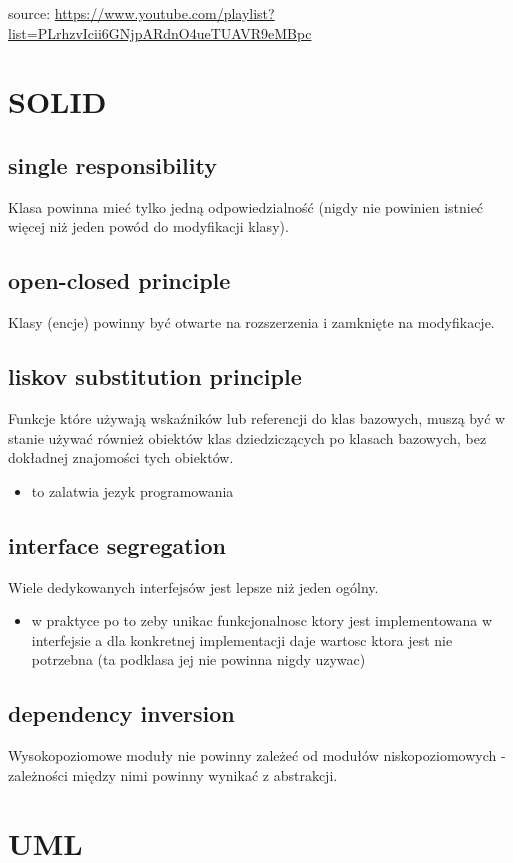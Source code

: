 \documentclass[11pt]{article}
\author{Patryk Kaniewski}
\date{\today}
\title{}
\begin{document}
\tableofcontents \clearpageOP source: \url{https://www.youtube.com/playlist?list=PLrhzvIcii6GNjpARdnO4ueTUAVR9eMBpc}
\section{SOLID}
\label{sec:orgd1616fa}
\subsection{single responsibility}
\label{sec:orgfc7fd51}
Klasa powinna mieć tylko jedną odpowiedzialność (nigdy nie powinien istnieć więcej niż jeden powód do modyfikacji klasy).
\subsection{open-closed principle}
\label{sec:org1d6bb2f}
Klasy (encje) powinny być otwarte na rozszerzenia i zamknięte na modyfikacje.
\subsection{liskov substitution principle}
\label{sec:org754c2a3}
Funkcje które używają wskaźników lub referencji do klas bazowych, muszą być w stanie używać również obiektów klas dziedziczących po klasach bazowych, bez dokładnej znajomości tych obiektów.
\begin{itemize}
\item to zalatwia jezyk programowania
\end{itemize}
\subsection{interface segregation}
\label{sec:orgd7543dd}
Wiele dedykowanych interfejsów jest lepsze niż jeden ogólny.
\begin{itemize}
\item w praktyce po to zeby unikac funkcjonalnosc ktory jest implementowana w interfejsie a dla konkretnej implementacji daje wartosc ktora jest nie potrzebna (ta podklasa jej nie powinna nigdy uzywac)
\end{itemize}
\subsection{dependency inversion}
\label{sec:org24f15a2}
Wysokopoziomowe moduły nie powinny zależeć od modułów niskopoziomowych - zależności między nimi powinny wynikać z abstrakcji.

\section{UML}
\label{sec:org4c1f5da}
\end{document}
